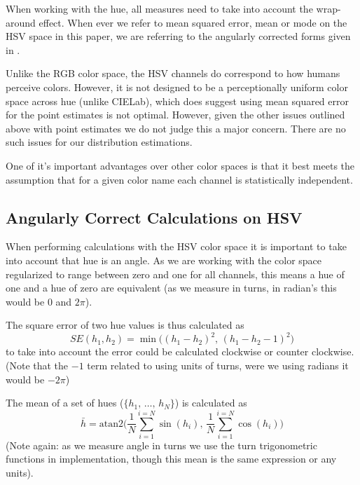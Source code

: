 \documentclass[11pt,a4paper]{article}
\begin{document}
When working with the hue, all measures need to take into account the wrap-around effect.
When ever we refer to mean squared error, mean or mode on the HSV space in this paper, we are referring to the angularly corrected forms given in .


Unlike the RGB color space, the HSV channels do correspond to how humans perceive colors.
However, it is not designed to be a perceptionally uniform color space across hue (unlike CIELab), which does suggest using mean squared error for the point estimates is not optimal.
However, given the other issues outlined above with point estimates we do not judge this a major concern.
There are no such issues for our distribution estimations.

One of it's important advantages over other color spaces is that it best meets the assumption that for a given color name each channel is statistically independent.

\subsection{Angularly Correct Calculations on HSV}\label{sec:angularly-correct}
When performing calculations with the HSV color space it is important to take into account that hue is an angle.
As we are working with the color space regularized to range between zero and one for all channels,
this means a hue of one and a hue of zero are equivalent (as we measure in turns, in radian's this would be $0$ and $2\pi$).

The square error of two hue values is thus calculated as
\begin{equation}
SE(h_1, h_2) = \min \big( \left(h_1 - h_2 \right)^2, \, \left(h_1 - h_2 -1 \right)^2  \big)
\end{equation}
to take into account the error could be calculated clockwise or counter clockwise.
(Note that the $-1$ term related to using units of turns, were we using radians it would be $-2\pi$)


The mean of a set of hues ($\lbrace h_1,\,\ldots,\,h_N \rbrace$) is calculated as 
\begin{equation}
\bar h = \mathrm{atan2} \Bigg(%
	\frac{1}{N} \sum_{i=1}^{i=N} \sin (h_i), \,  %
	\frac{1}{N} \sum_{i=1}^{i=N} \cos (h_i)%
\Bigg)%
\end{equation}
(Note again: as we measure angle in turns we use the turn trigonometric functions in implementation, though this mean is the same expression or any units).
\end{document}
